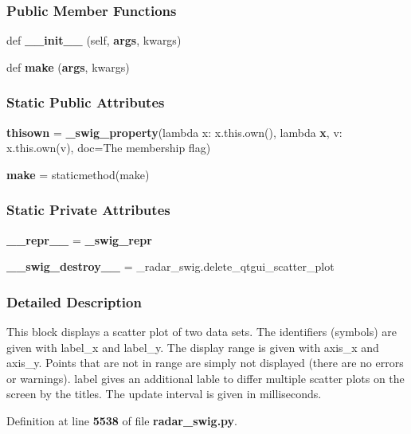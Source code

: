\subsubsection*{Public Member Functions}
\begin{DoxyCompactItemize}
\item 
def {\bf \+\_\+\+\_\+init\+\_\+\+\_\+} (self, {\bf args}, kwargs)
\item 
def {\bf make} ({\bf args}, kwargs)
\end{DoxyCompactItemize}
\subsubsection*{Static Public Attributes}
\begin{DoxyCompactItemize}
\item 
{\bf thisown} = {\bf \+\_\+swig\+\_\+property}(lambda x\+: x.\+this.\+own(), lambda {\bf x}, v\+: x.\+this.\+own(v), doc=\textquotesingle{}The membership flag\textquotesingle{})
\item 
{\bf make} = staticmethod(make)
\end{DoxyCompactItemize}
\subsubsection*{Static Private Attributes}
\begin{DoxyCompactItemize}
\item 
{\bf \+\_\+\+\_\+repr\+\_\+\+\_\+} = {\bf \+\_\+swig\+\_\+repr}
\item 
{\bf \+\_\+\+\_\+swig\+\_\+destroy\+\_\+\+\_\+} = \+\_\+radar\+\_\+swig.\+delete\+\_\+qtgui\+\_\+scatter\+\_\+plot
\end{DoxyCompactItemize}


\subsubsection{Detailed Description}
\begin{DoxyVerb}This block displays a scatter plot of two data sets. The identifiers (symbols) are given with label_x and label_y. The display range is given with axis_x and axis_y. Points that are not in range are simply not displayed (there are no errors or warnings). label gives an additional lable to differ multiple scatter plots on the screen by the titles. The update interval is given in milliseconds.\end{DoxyVerb}
 

Definition at line {\bf 5538} of file {\bf radar\+\_\+swig.\+py}.




